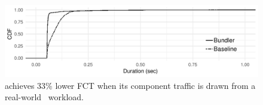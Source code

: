 \begin{figure}
    \centering
\begin{knitrout}
\color{fgcolor}
\includegraphics[width=\maxwidth]{figure/robust:caida-1} 

\end{knitrout}
    \caption{\name achieves 33\% lower FCT when its component traffic is drawn from a real-world~\cite{caida-dataset} workload.}
    \label{fig:robust:caidacdf}
\end{figure}

